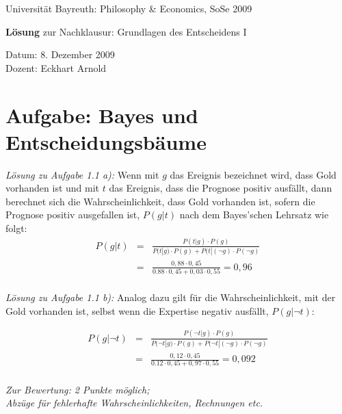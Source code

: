 \documentclass[10pt, a4paper, german]{article}
\numberwithin {equation}{section}
\begin{document}
\begin{center}
{\large Universität Bayreuth: Philosophy \& Economics, SoSe 2009}
\end{center}
\vspace{0.4em}
\begin{center}
{\huge {\bf Lösung} zur Nachklausur: Grundlagen des Entscheidens I}
\end{center}
\vspace{0.0em}
\begin{center}
Datum: 8. Dezember 2009\\
Dozent: Eckhart Arnold
\end{center}


\section{Aufgabe: Bayes und Entscheidungsbäume}

{\em Lösung zu Aufgabe 1.1 a):} Wenn mit $g$ das Ereignis bezeichnet wird, dass
Gold vorhanden ist und mit $t$ das Ereignis, dass die Prognose positiv ausfällt,
dann berechnet sich die Wahrscheinlichkeit, dass Gold vorhanden ist, sofern die
Prognose positiv ausgefallen ist, $P(g|t)$ nach dem Bayes'schen Lehrsatz wie
folgt:
\begin{eqnarray}
P(g|t) & = &
\frac{P(t|g)\cdot P(g)}{P(t|g)\cdot P(g) + P(t|(\neg g)\cdot P(\neg g)} \\
 & = & \frac{0,88\cdot 0,45}{0.88\cdot 0,45 + 0,03\cdot 0,55} = 0,96 \\
\end{eqnarray}

{\em Lösung zu Aufgabe 1.1 b):} Analog dazu gilt für die Wahrscheinlichkeit,
mit der Gold vorhanden ist, selbst wenn die Expertise negativ ausfällt,
$P(g|\neg t)$:

\begin{eqnarray}
P(g|\neg t) & = &
\frac{P(\neg t|g)\cdot P(g)}{P(\neg t|g)\cdot P(g) + P(\neg t|(\neg g)\cdot
P(\neg g)}
\\
 & = & \frac{0,12\cdot 0,45}{0.12\cdot 0,45 + 0,97\cdot 0,55} = 0,092 \\
\end{eqnarray}

\vspace{0.25cm}

{\em Zur Bewertung: 2 Punkte möglich; \\
Abzüge für fehlerhafte Wahrscheinlichkeiten, Rechnungen etc.}

\vspace{0.5cm}
\end{document}
